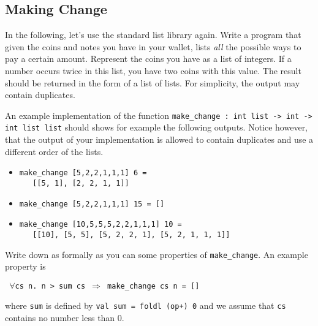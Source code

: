 \documentclass[a4paper,10pt,oneside]{scrartcl}
\begin{document}
\subsection{Making Change}

In the following, let's use the standard list library again. Write a
program that given the coins and notes you have in your wallet, lists
\emph{all} the possible ways to pay a certain amount. Represent the
coins you have as a list of integers. If a number occurs twice in
this list, you have two coins with this value. The result should be
returned in the form of a list of lists. For simplicity, the output
may contain duplicates.

An example implementation of the function 
\texttt{make\_change\ :\ int list -> int -> int list list} should
shows for example the following outputs. Notice however, that the output of
your implementation is allowed to contain duplicates and use a different
order of the lists.

\begin{itemize}
\item \texttt{make\_change [5,2,2,1,1,1] 6 =}\\
\-\texttt{\ \ \ [[5, 1], [2, 2, 1, 1]]}
\item \texttt{make\_change [5,2,2,1,1,1] 15 = []}
\item \texttt{make\_change [10,5,5,5,2,2,1,1,1] 10 =}\\
      \-\texttt{\ \ \ [[10], [5, 5], [5, 2, 2, 1], [5, 2, 1, 1, 1]]}
\end{itemize}
\bigskip
Write down as formally as you can some properties of \texttt{make\_change}. An example
property is

\begin{center}\texttt{
$\forall$cs n. n > sum cs $\Longrightarrow$ make\_change cs n = []}
\end{center}
where \texttt{sum} is defined by \texttt{val sum = foldl (op+) 0} and we assume that \texttt{cs} contains no number less than 0.
\end{document}
